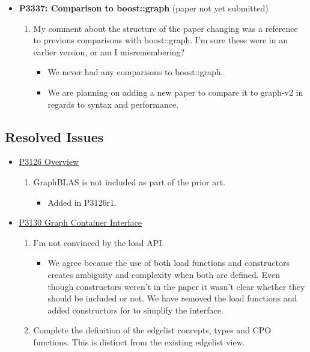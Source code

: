 \begin{itemize}
\begin{enumerate}
\begin{itemize}
                        \end{itemize}
            \end{enumerate}
      \item \textbf{P3337: Comparison to boost::graph} (paper not yet submitted)
            \begin{enumerate}
                  \item My comment about the structure of the paper changing was a reference to previous comparisons with boost::graph. 
                        I'm sure these were in an earlier version, or am I misremembering?
                  \begin{itemize}
                        \item We never had any comparisons to boost::graph. 
                        \item We are planning on adding a new paper to compare it to graph-v2 in regards to syntax and performance.
                  \end{itemize}
            \end{enumerate}
\end{itemize}

\subsection{Resolved Issues}
\begin{itemize}
      \item \href{https://www.wg21.link/P3126}{P3126 Overview}
            \begin{enumerate}
                  \item GraphBLAS is not included as part of the prior art.
                        \begin{itemize}
                              \item Added in P3126r1.
                        \end{itemize}
            \end{enumerate}
      \item \href{https://www.wg21.link/P3130}{P3130 Graph Container Interface}
            \begin{enumerate}
                  \item I'm not convinced by the load API.
                        \begin{itemize}
                              \item We agree because the use of both load functions and constructors creates ambiguity and complexity when both are defined.
                                    Even though constructors weren't in the paper it wasn't clear whether they should be included or not.
                                    We have removed the load functions and added constructors for  to simplify the interface.
                        \end{itemize}
                        \item Complete the definition of the edgelist concepts, types and CPO functions. This is distinct from the existing edgelist view.
                  \end{enumerate}
\end{itemize}
